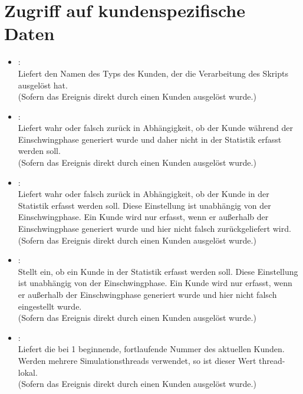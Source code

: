 \section{Zugriff auf kundenspezifische Daten}

\begin{itemize}

\item
{}:\\
Liefert den Namen des Typs des Kunden, der die Verarbeitung des Skripts ausgelöst hat.\\
(Sofern das Ereignis direkt durch einen Kunden ausgelöst wurde.)

\item
{}:\\
Liefert wahr oder falsch zurück in Abhängigkeit, ob der Kunde während der Einschwingphase generiert wurde und
daher nicht in der Statistik erfasst werden soll.\\
(Sofern das Ereignis direkt durch einen Kunden ausgelöst wurde.)
	
\item
{}:\\
Liefert wahr oder falsch zurück in Abhängigkeit, ob der Kunde in der Statistik erfasst werden soll.
Diese Einstellung ist unabhängig von der Einschwingphase. Ein Kunde wird nur erfasst, wenn er außerhalb
der Einschwingphase generiert wurde und hier nicht falsch zurückgeliefert wird.\\
(Sofern das Ereignis direkt durch einen Kunden ausgelöst wurde.)
  
\item
{}:\\
Stellt ein, ob ein Kunde in der Statistik erfasst werden soll.
Diese Einstellung ist unabhängig von der Einschwingphase. Ein Kunde wird nur erfasst, wenn er außerhalb
der Einschwingphase generiert wurde und hier nicht falsch eingestellt wurde.\\
(Sofern das Ereignis direkt durch einen Kunden ausgelöst wurde.)
  
\item
{}:\\
Liefert die bei 1 beginnende, fortlaufende Nummer des aktuellen Kunden.
Werden mehrere Simulationsthreads verwendet, so ist dieser Wert thread-lokal.\\
(Sofern das Ereignis direkt durch einen Kunden ausgelöst wurde.)


\end{itemize}
